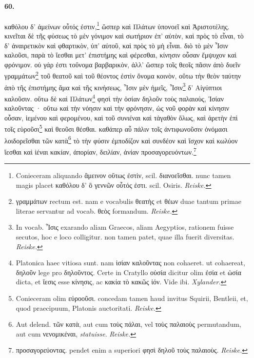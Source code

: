 \documentclass[a4paper, 11pt, oneside, polutonikogreek, german]{article}
\begin{document}
\paragraph{60.}
καθόλου δ' ἀμείνων οὗτός ἐστιν,\footnote{Conieceram aliquando ἂμεινον οὕτως ἐστὶν, scil. διανοεῖσθαι. nunc tamen magis placet καθόλου δ' ὃ γεννῶν οὗτός ἐστι. scil. Osiris. \emph{Reiske.} } ὥσπερ καὶ Πλάτων ὑπονοεῖ καὶ Ἀριστοτέλης. κινεῖται δὲ τῆς φύσεως τὸ μὲν γόνιμον καὶ σωτήριον ἐπ' αὐτὸν, καὶ πρὸς τὸ εἶναι, τὸ δ' ἀναιρετικὸν καὶ φθαρτικὸν, ὑπ' αὐτοῦ, καὶ πρὸς τὸ μὴ εἶναι. διὸ τὸ μὲν Ἶσιν καλοῦσι, παρὰ τὸ ἵεσθαι μετ' ἐπιστήμης καὶ φέρεσθαι, κίνησιν οὖσαν ἔμψυχον καὶ φρόνιμον. οὐ γάρ ἐστι τοὔνομα βαρβαρικὸν, ἀλλ' ὥσπερ τοῖς θεοῖς πᾶσιν ἀπὸ δυεῖν γραμμάτων\footnote{γραμμάτων rectum est. nam e vocabulis θεατὴς et θέων duae tantum primae literae servantur ad vocab. θεὸς formandum. \emph{Reiske.} } τοῦ θεατοῦ καὶ τοῦ θέοντος ἐστὶν ὄνομα κοινὸν, οὕτω τὴν θεὸν ταύτην ἀπὸ τῆς ἐπιστήμης ἅμα καὶ τῆς κινήσεως, Ἶσιν μὲν ἡμεῖς, Ἶσιν\footnote{In vocab. Ἶσις exarando aliam Graecos, aliam Aegyptios, rationem fuisse secutos, hoc e loco colligitur. non tamen patet, quae illa fuerit diversitas. \emph{Reiske.}} δ' Αἰγύπτιοι καλοῦσιν. οὕτω δὲ καὶ Πλάτων\footnote{Platonica haec vitiosa sunt. nam ἰσίαν καλοῦντας non cohaeret. ut cohaereat, δηλοῦν lege pro δηλοῦντος. Certe in Cratyllo οὐσία dicitur olim ἐσία et ὡσία dicta, et ἴεσις esse κίνησις, ac κακία τὸ κακῶς ἰόν. Vide ibi. \emph{Xylander.}} φησὶ τὴν ὁσίαν δηλοῦν τοὺς παλαιοὺς, Ἰσίαν καλοῦντας · οὕτω καὶ τὴν νόησιν καὶ τὴν φρόνησιν, ὡς νοῦ φορὰν καὶ κίνησιν οὖσαν, ἱεμένου καὶ φερομένου, καὶ τοῦ συνιέναι καὶ τἀγαθὸν ὅλως, καὶ ἀρετὴν ἐπὶ τοῖς εὑροῦσι\footnote{Conieceram olim εὐροοῦσι. concedam tamen haud invitus Squirii, Bentleii, et, quod praecipuum, Platonis auctoritati. \emph{Reiske.}} καὶ θεοῦσι θέσθαι. καθάπερ αὖ πάλιν τοῖς ἀντιφωνοῦσιν ὀνόμασι λοιδορεῖσθαι τῶν κατὰ\footnote{Aut delend. τῶν κατὰ, aut cum τοὺς πάλαι, vel τοὺς παλαιοὺς permutandum, aut cum νενομικέναι, \emph{statuisse}. \emph{Reiske.} } τὸ τὴν φύσιν ἐμποδίζον καὶ συνδέον καὶ ἴσχον καὶ κωλύον ἵεσθαι καὶ ἰέναι κακίαν, ἀπορίαν, δειλίαν, ἀνίαν προσαγορευόντων.\footnote{προσαγορεύοντας. pendet enim a superiori φησὶ δηλοῦ τοὺς παλαιοὺς. \emph{Reiske.}}
\end{document}
